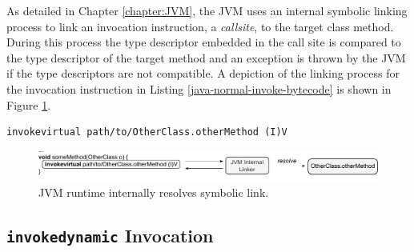 As detailed in Chapter \ref{chapter:JVM}, the JVM uses an internal symbolic linking process to link an invocation instruction, a \emph{callsite}, to the target class method.  During this process the type descriptor embedded in the call site is compared to the type descriptor of the target method and an exception is thrown by the JVM if the type descriptors are not compatible.  A depiction of the linking process for the invocation instruction in Listing \ref{java-normal-invoke-bytecode} is shown in Figure \ref{fig:linking-invokevirtual}.
\vspace{2em}
\begin{lstlisting}[language=jvm-bytecode,caption=virtual method invocation bytecode,label=java-normal-invoke-bytecode]
invokevirtual path/to/OtherClass.otherMethod (I)V
\end{lstlisting}
\vspace{2em}
\begin{figure}[htbp]
	\centering
		\includegraphics[width=\textwidth]{./Figures/linking-invokevirtual.pdf}
	\caption[invokevirtual Linking]{JVM runtime internally resolves symbolic link.}
	\label{fig:linking-invokevirtual}
\end{figure}

\subsection{\texttt{invokedynamic} Invocation}

